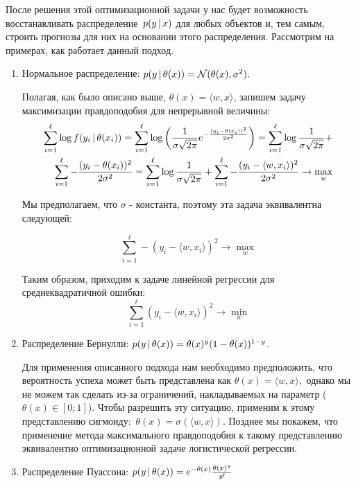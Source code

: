 \documentclass[12pt,a4paper]{article}
\begin{document}
    После решения этой оптимизационной задачи у нас будет возможность восстанавливать распределение~$p(y \mspace{3mu}{|}\mspace{3mu} x)$ для любых объектов и, тем самым, строить прогнозы для них на основании этого распределения. Рассмотрим на примерах, как работает данный подход.
    \newpage
    \begin{enumerate}
        \item Нормальное распределение: $p(y \mspace{3mu}{|}\mspace{3mu} \theta(x)) = \mathcal{N} (\theta(x), \sigma^2).$
        
        Полагая, как было описано выше, $\theta(x) = \langle w, x \rangle$, запишем задачу максимизации правдоподобия для непрерывной величины: 
        \begin{align*}
            \sum_{i=1}^\ell \log f(y_i \mspace{3mu}{|}\mspace{3mu} \theta(x_i)) =
            \sum_{i=1}^\ell 
            \log \left( \frac{1}{\sigma\sqrt{2\pi}} e^{-\frac{(y_i-\theta(x_i))^2}{2 \sigma^2}}
            \right)
            = 
            \sum_{i=1}^\ell
            \log \frac{1}{\sigma\sqrt{2\pi}}
            + \\
            \sum_{i=1}^\ell
            -\frac{(y_i-\theta(x_i))^2}{2 \sigma^2}
            = 
            \sum_{i=1}^\ell
            \log \frac{1}{\sigma\sqrt{2\pi}}
            + 
            \sum_{i=1}^\ell
            -\frac{(y_i-\langle w, x_i \rangle)^2}{2 \sigma^2}
            \to \max_w
        \end{align*}
        
        Мы предполагаем, что $\sigma$ - константа, поэтому эта задача эквивалентна следующей: 
        
        \begin{equation*}
            \sum_{i=1}^\ell
            -(y_i-\langle w, x_i \rangle)^2
            \to \max_w
        \end{equation*}
        
        Таким образом, приходим к задаче линейной регрессии для среднеквадратичной ошибки:
        \begin{equation}
            \sum_{i=1}^\ell (y_i - \langle w, x_i \rangle)^2 \to \min_w
        \end{equation}
        \item Распределение Бернулли: $p(y \mspace{3mu}{|}\mspace{3mu} \theta(x)) = \theta(x)^{y} (1 - \theta(x))^{1 - y}$.
        
        Для применения описанного подхода нам необходимо предположить, что вероятность успеха может быть представлена как $\theta(x) = \langle w, x \rangle,$ однако мы не можем так сделать из-за ограничений, накладываемых на параметр ($\theta(x) \in [0; 1]$). Чтобы разрешить эту ситуацию, применим к этому представлению сигмоиду:~$\theta(x) = \sigma(\langle w, x \rangle)$. Позднее мы покажем, что применение метода максимального правдоподобия к такому представлению эквивалентно оптимизационной задаче логистической регрессии.
        \item Распределение Пуассона: $p(y \mspace{3mu}{|}\mspace{3mu} \theta(x)) = e^{- \theta(x)} \frac{\theta(x)^y}{y!}$
        

\end{enumerate}
\end{document}
